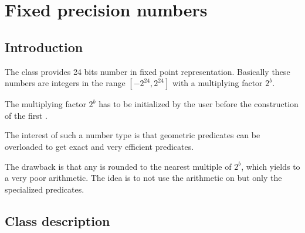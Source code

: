 
\marginparwidth 1.5cm
\def\ccTagChapterRelease{\ccTrue}
\def\ccTagChapterAuthor{\ccTrue}

\chapter{Fixed precision numbers} \label{I1_Chapter_Fixed_precision_nt}



\section{Introduction} 

The class  provides 24 bits number in fixed point representation.
Basically these numbers are integers in the range
$[-2^{24},2^{24}]$ with a multiplying factor $2^b$.

The multiplying factor $2^b$ has to be initialized by the user
before the construction of the first .

The interest of such a number type is that geometric predicates
can be overloaded to get exact and very efficient predicates.

The drawback is that any  is rounded to the nearest
multiple of $2^b$, which yields to a very poor arithmetic.
The idea is to not use the arithmetic on 
but only the specialized predicates.

\section{Class description}



